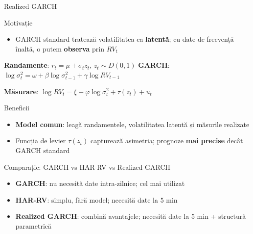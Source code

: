 \documentclass[9pt, aspectratio=169, t]{beamer}
\begin{document}
\begin{frame}{Realized GARCH}
    \small
        \vspace{-0.4cm}
        \begin{block}{Motivație}
            \begin{itemize}
                \item GARCH standard tratează volatilitatea ca \textbf{latentă}; cu date de frecvență înaltă, o putem \textbf{observa} prin $RV_t$
            \end{itemize}
        \end{block}
        \vspace{-2.5mm}
        \begin{defn}
            \textbf{Randamente}: $r_t = \mu + \sigma_t z_t$, $z_t \sim D(0,1)$ \quad
            \textbf{GARCH}: $\log \sigma_t^2 = \omega + \beta \log \sigma_{t-1}^2 + \gamma \log RV_{t-1}$

            \textbf{Măsurare}: $\log RV_t = \xi + \varphi \log \sigma_t^2 + \tau(z_t) + u_t$
        \end{defn}
        \vspace{-2.5mm}
        \begin{exampleblock}{Beneficii}
            \begin{itemize}
                \item \textbf{Model comun}: leagă randamentele, volatilitatea latentă și măsurile realizate
                \item Funcția de levier $\tau(z_t)$ capturează asimetria; prognoze \textbf{mai precise} decât GARCH standard
            \end{itemize}
        \end{exampleblock}
        \vspace{-2.5mm}
        \begin{alertblock}{Comparație: GARCH vs HAR-RV vs Realized GARCH}
            \begin{itemize}
                \item \textbf{GARCH}: nu necesită date intra-zilnice; cel mai utilizat
                \item \textbf{HAR-RV}: simplu, fără model; necesită date la 5 min
                \item \textbf{Realized GARCH}: combină avantajele; necesită date la 5 min + structură parametrică
            \end{itemize}
        \end{alertblock}
\end{frame}
\end{document}
